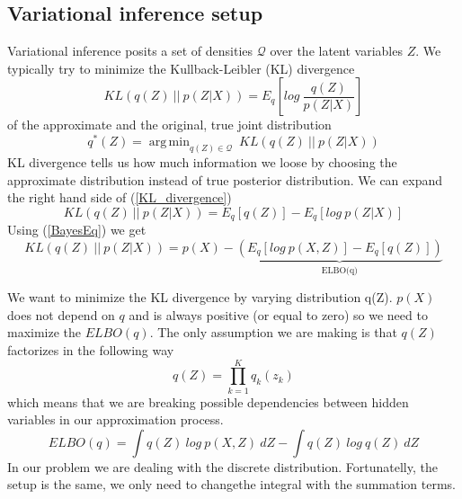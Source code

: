 \documentclass{article}
\newcommand\ProdK{\prod_{k=1}^{K}}
\newcommand\Qfactor{\ProdK{q_k(z_k)}}
\DeclareMathOperator*{\argminA}{arg\,min}
\begin{document}
\subsection{Variational inference setup}
Variational inference posits a set of densities $\mathcal{Q}$  over the latent variables $Z$. We typically try to minimize the Kullback-Leibler (KL) divergence
\begin{equation}\label{KL_divergence}
    KL(q(Z)\: ||\: p(Z|X)) = E_{q}\left[log\:\frac{q(Z)}{p(Z|X)}\right]
\end{equation}
of the approximate and the original, true joint distribution
\begin{equation}
    q^*(Z) = \argminA_{q(Z)\in\mathcal{Q}}\: KL(q(Z)\: ||\: p(Z|X))
\end{equation}
KL divergence tells us how much information we loose by choosing the approximate distribution instead of true posterior distribution. 
We can expand the right hand side of (\ref{KL_divergence})
\begin{equation}
KL(q(Z)\: ||\: p(Z|X)) = E_q[q(Z)] - E_q[log\:p(Z|X)]
\end{equation}
Using (\ref{BayesEq}) we get
\begin{equation}
KL(q(Z)\: ||\: p(Z|X)) = p(X) - \underbrace{(E_q[log\:p(X,Z)] - E_q[q(Z)])}_\text{ELBO(q)}
\end{equation}

We want to minimize the KL divergence by varying distribution q(Z). $p(X)$ does not depend on $q$ and is always positive (or equal to zero) so we need to maximize the $ELBO(q)$. The only assumption we are making is that $q(Z)$ factorizes in the following way 
\begin{equation}
q(Z)=\Qfactor{}
\end{equation}
which means that we are breaking possible dependencies between hidden variables in our approximation process.
\begin{equation}
    ELBO(q) = \int q(Z)\: log\:{p(X,Z)}\:dZ - \int q(Z)\:log{\:q(Z)}\:dZ
\end{equation}
In our problem we are dealing with the discrete distribution. Fortunatelly, the setup is the same, we only need to changethe integral with the summation terms.
\end{document}

